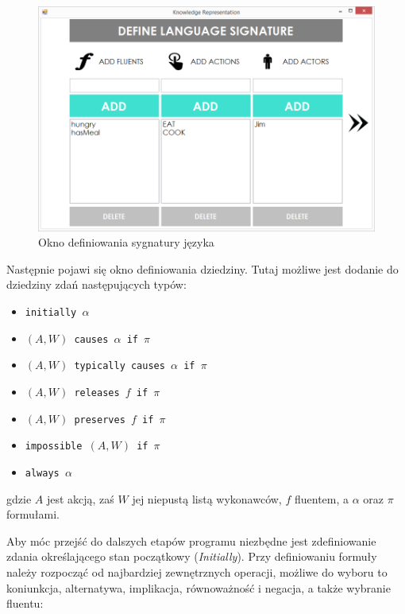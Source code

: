\documentclass{article}
\begin{document}
\begin{figure}[H]
\centering
\includegraphics[scale=0.4]{05}
\caption{Okno definiowania sygnatury języka}
\end{figure}

Następnie pojawi się okno definiowania dziedziny. Tutaj możliwe jest dodanie do dziedziny zdań następujących typów: 
\begin{itemize}
\item {\large\texttt{initially $\alpha$}}\\
\item {\large\texttt{$(A,W)$ causes $\alpha$ if $\pi$}}\\
\item {\large\texttt{$(A,W)$ typically causes $\alpha$ if $\pi$}}\\
\item {\large\texttt{$(A,W)$ releases $f$ if $\pi$}}\\
\item {\large\texttt{$(A,W)$ preserves $f$ if $\pi$}}\\
\item {\large\texttt{impossible $(A,W)$ if $\pi$}}\\
\item {\large\texttt{always $\alpha$}}\\
\end{itemize}
gdzie $A$ jest akcją, zaś $W$ jej niepustą listą wykonawców, $f$ fluentem, a $\alpha$ oraz $\pi$ formułami.
\newpage

Aby móc przejść do dalszych etapów programu niezbędne jest zdefiniowanie zdania określającego stan początkowy (\textit{Initially}). 
Przy definiowaniu formuły należy rozpocząć od najbardziej zewnętrznych operacji, możliwe do wyboru to koniunkcja, alternatywa, implikacja, równoważność i negacja, a także wybranie fluentu: 
\end{document}
